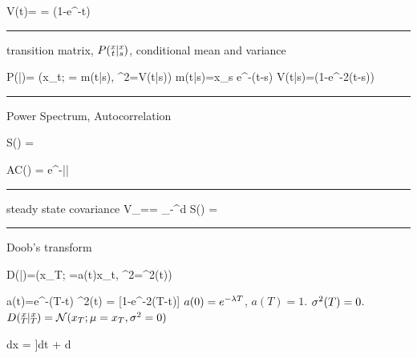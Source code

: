 \beq
V(t)=
 = (1-e^{-\lam t})
\eeq



\hrule
\noindent transition  matrix, $P({\substack{x\\t}}|{\substack{x\\s}})$, conditional mean and variance

\beq
P(|)= \caln(x_t; \mu= m(t|s), \s^2=V(t|s))
\eeq
\beq
m(t|s)=x_s e^{-\lam (t-s)}
\eeq
\beq
V(t|s)=(1-e^{-2\lam (t-s)})
\eeq
\hrule\noindent Power Spectrum, Autocorrelation

\beq
S(\omega) =
\eeq

\beq AC(\tau) =
e^{-\lam|\tau|}
\eeq

\hrule\noindent steady state covariance
\beq
V_\infty==
\int_{-\infty}^{\infty}d\omega\; S(\omega) = 
\eeq

\hrule \noindent Doob's transform

\beq
D(|)=\caln(x_T; \mu=a(t)x_t, \s^2=\sigma^2(t))
\eeq

\beq
a(t)=e^{-\lam(T-t)}
\eeq
\beq
\s^2(t) = [1-e^{-2\lam(T-t)}]
\eeq
$a(0)=e^{-\lambda T}$, $a(T)=1$. $\sigma^2(T)=0$. 
$D({\substack{x\\T}}|{\substack{x\\T}})=
{\cal N}(x_T; \mu=x_T, \sigma^2=0)$


\beq
dx = \left[
-\lam x+ \frac{qa}{\s^2}[x_T-ax]
\right]dt + d\rvB
\eeq
